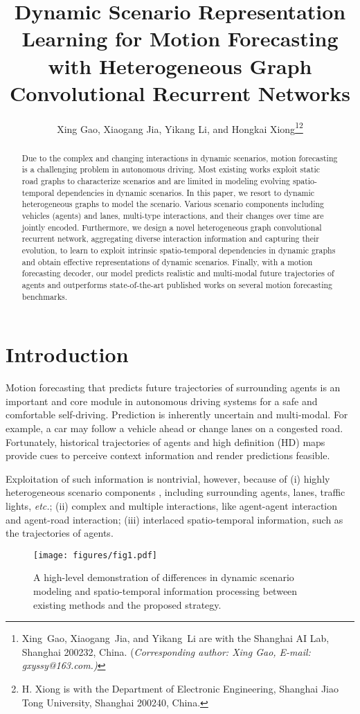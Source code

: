 \documentclass[letterpaper, 10 pt, conference]{ieeeconf}
\title{\LARGE \bf
Dynamic Scenario Representation Learning for Motion Forecasting with Heterogeneous Graph Convolutional Recurrent Networks 
}
\author{Xing Gao, Xiaogang Jia, Yikang Li, and Hongkai Xiong\thanks{Xing~Gao, Xiaogang~Jia, and Yikang~Li are with the Shanghai AI Lab, Shanghai 200232, China. (\textit{Corresponding author: Xing Gao, E-mail:    gxyssy@163.com.)}}\thanks{H. Xiong is with the Department of Electronic Engineering, Shanghai Jiao Tong University, Shanghai 200240, China.}}
\begin{document}
\maketitle
\thispagestyle{empty}
\pagestyle{empty}

\begin{abstract}
Due to the complex and changing interactions in dynamic scenarios, motion forecasting is a challenging problem in autonomous driving. Most existing works exploit static road graphs to characterize scenarios and are limited in modeling evolving spatio-temporal dependencies in dynamic scenarios. In this paper, we resort to dynamic heterogeneous graphs to model the scenario. Various scenario components including vehicles (agents) and lanes,  multi-type interactions, and their changes over time are jointly encoded. Furthermore, we design a novel heterogeneous graph convolutional recurrent network, aggregating diverse interaction information and capturing their evolution, to learn to exploit intrinsic spatio-temporal dependencies in dynamic graphs and obtain effective representations of  dynamic scenarios. Finally, with a motion forecasting decoder, our model predicts realistic and multi-modal future trajectories of agents and outperforms  state-of-the-art published works on several motion forecasting benchmarks.
\end{abstract}

\section{Introduction}
Motion forecasting that predicts future trajectories of surrounding agents is an important and core module in autonomous driving systems for a safe and comfortable self-driving. 
Prediction is inherently uncertain and multi-modal.
For example, a car may follow a vehicle ahead or change lanes on a congested road.
Fortunately, historical trajectories of agents and high definition (HD) maps provide  cues to perceive context information and render predictions feasible. 

Exploitation of such information is nontrivial, however, because of 
(i) highly heterogeneous scenario components \cite{varadarajan2021multipath}, including surrounding agents, lanes, traffic lights, \textit{etc.}; (ii) complex and multiple interactions, like agent-agent interaction and agent-road interaction; (iii) interlaced spatio-temporal  information, such as the trajectories of agents. 

\begin{figure}[tp]
\vskip 0.04in
\begin{center}
\centerline{\texttt{[image: figures/fig1.pdf]}}
\caption{A high-level demonstration of differences in dynamic scenario modeling and spatio-temporal information processing between existing methods and the proposed strategy.}\label{fig.0}
\end{center}
\vskip -0.2in
\end{figure}
\end{document}
